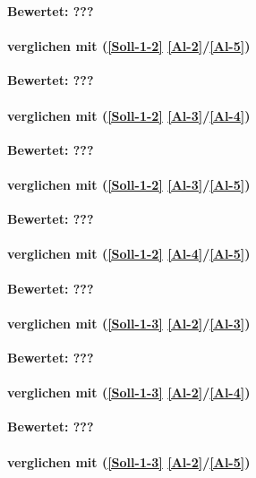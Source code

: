 \textbf{Bewertet: ???}

\paragraph*{  verglichen mit  (\ref{Soll-1-2} \ref{Al-2}/\ref{Al-5})}

\textbf{Bewertet: ???}

\paragraph*{  verglichen mit  (\ref{Soll-1-2} \ref{Al-3}/\ref{Al-4})}

\textbf{Bewertet: ???}

\paragraph*{  verglichen mit  (\ref{Soll-1-2} \ref{Al-3}/\ref{Al-5})}

\textbf{Bewertet: ???}


\paragraph*{  verglichen mit  (\ref{Soll-1-2} \ref{Al-4}/\ref{Al-5})}

\textbf{Bewertet: ???}


\paragraph*{  verglichen mit  (\ref{Soll-1-3} \ref{Al-2}/\ref{Al-3})}

\textbf{Bewertet: ???}

\paragraph*{  verglichen mit  (\ref{Soll-1-3} \ref{Al-2}/\ref{Al-4})}

\textbf{Bewertet: ???}

\paragraph*{  verglichen mit  (\ref{Soll-1-3} \ref{Al-2}/\ref{Al-5})}

